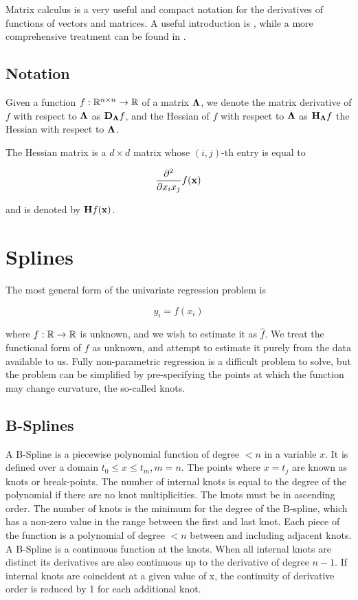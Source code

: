 \documentclass{article}[12pt]
\begin{document}
Matrix calculus is a very useful and compact notation for the derivatives of functions of vectors and matrices.
A useful introduction is \cite{wand02}, while a more comprehensive treatment can be found in
\cite{MagnusNeudecker99}.

\subsection{Notation}

Given a function $f:{\mathbb{R}}^{n \times n} \to {\mathbb{R}}$ of a matrix ${\boldsymbol \Lambda}$, we denote the matrix derivative of $f$ with 
respect to ${\boldsymbol \Lambda}$ as ${\bf D}_{\boldsymbol \Lambda} f$, and the Hessian of $f$ with respect to ${\boldsymbol \Lambda}$ as
${\bf H}_{\boldsymbol \Lambda} f$ the Hessian with respect to ${\boldsymbol \Lambda}$.

The Hessian matrix is a $d \times d$ matrix whose $(i, j)$-th entry is equal to

$$
\frac{\partial^2}{\partial x_i x_j} f({\bf x})
$$

and is denoted by ${\bf H} f({\bf x})$.

\section{Splines}
The most general form of the univariate regression problem is

$$
y_i = f(x_i)
$$

where $f: {\mathbb{R}} \to {\mathbb{R}}$ is unknown, and we wish to estimate it as $\hat{f}$. We treat the functional form of
$f$ as unknown, and attempt to estimate it purely from the data available to us. Fully non-parametric regression
is a difficult problem to solve, but the problem can be simplified by pre-specifying the points at which the
function may change curvature, the so-called knots.

\subsection{B-Splines}
A B-Spline is a piecewise polynomial function of degree $< n$ in a variable $x$. It is defined over a
domain $t_0 \leq x \leq t_m, m=n$. The points where $x = t_j$ are known as knots or break-points. The
number of internal knots is equal to the degree of the polynomial if there are no knot multiplicities.
The knots must be in ascending order. The number of knots is the minimum for the degree of the B-spline,
which has a non-zero value in the range between the first and last knot. Each piece of the function is a
polynomial of degree $< n$ between and including adjacent knots. A B-Spline is a continuous function at the
knots. When all internal knots are distinct its derivatives are also continuous up to the derivative of degree
$n - 1$. If internal knots are coincident at a given value of x, the continuity of derivative order is reduced
by 1 for each additional knot.
\end{document}
